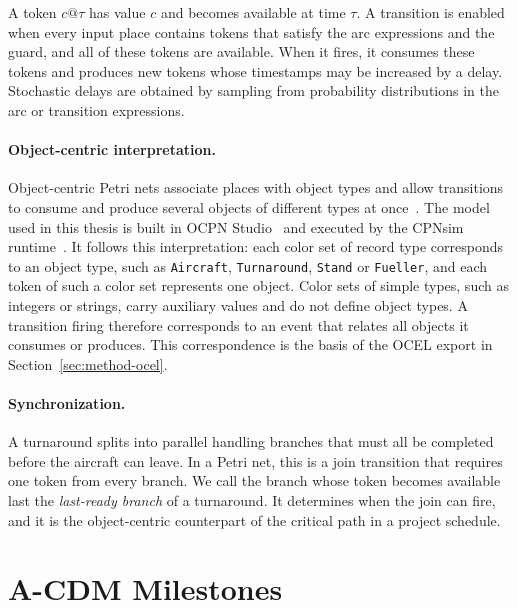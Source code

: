 A token $c@\tau$ has value $c$ and becomes available at time $\tau$. A transition is enabled when every input place contains tokens that satisfy the arc expressions and the guard, and all of these tokens are available. When it fires, it consumes these tokens and produces new tokens whose timestamps may be increased by a delay. Stochastic delays are obtained by sampling from probability distributions in the arc or transition expressions.

\paragraph{Object-centric interpretation.}
Object-centric Petri nets associate places with object types and allow transitions to consume and produce several objects of different types at once~\cite{vanderaalst2020ocpn}. The model used in this thesis is built in OCPN Studio~\cite{ocpn_studio} and executed by the CPNsim runtime~\cite{cpnsim}. It follows this interpretation: each color set of record type corresponds to an object type, such as \texttt{Aircraft}, \texttt{Turnaround}, \texttt{Stand} or \texttt{Fueller}, and each token of such a color set represents one object. Color sets of simple types, such as integers or strings, carry auxiliary values and do not define object types. A transition firing therefore corresponds to an event that relates all objects it consumes or produces. This correspondence is the basis of the OCEL export in Section~\ref{sec:method-ocel}.

\paragraph{Synchronization.}
A turnaround splits into parallel handling branches that must all be completed before the aircraft can leave. In a Petri net, this is a join transition that requires one token from every branch. We call the branch whose token becomes available last the \emph{last-ready branch} of a turnaround. It determines when the join can fire, and it is the object-centric counterpart of the critical path in a project schedule.

\section{A-CDM Milestones}
\label{sec:prelim-acdm}

